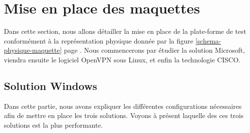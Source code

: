 \section{Mise en place des maquettes}

Dans cette section, nous allons détailler la mise en place de la plate-forme de test conformément à la représentation physique donnée par la figure \ref{schema-physique-maquette} page \pageref{schema-physique-maquette}. Nous commencerons par étudier la solution Microsoft, viendra ensuite le logiciel OpenVPN sous Linux, et enfin la technologie CISCO.

\subsection{Solution Windows}







Dans cette partie, nous avons expliquer les différentes configurations nécessaires afin de mettre en place les trois solutions. Voyons à présent laquelle des ces trois solutions est la plus performante.

\pagebreak

